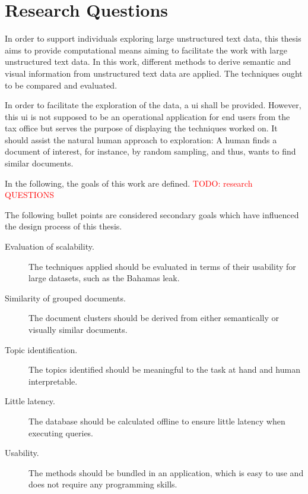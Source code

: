 \section{Research Questions}\label{sec:research-questions}

In order to support individuals exploring large unstructured text data, this thesis aims to provide computational means aiming to facilitate the work with large unstructured text data.
In this work, different methods to derive semantic and visual information from unstructured text data are applied.
The techniques ought to be compared and evaluated.

In order to facilitate the exploration of the data, a \ac{ui} shall be provided.
However, this \ac{ui} is not supposed to be an operational application for end users from the tax office 
but serves the purpose of displaying the techniques worked on.
It should assist the natural human approach to exploration:
A human finds a document of interest, for instance, by random sampling, and thus, wants to find similar documents.

In the following, the goals of this work are defined.
\textcolor{red}{TODO: research QUESTIONS}

The following bullet points are considered secondary goals which have influenced the design process of this thesis.
\begin{description}
    \item[Evaluation of scalability.]
    The techniques applied should be evaluated in terms of their usability for large datasets, such as the Bahamas leak.
    \item[Similarity of grouped documents.]
    The document clusters should be derived from either semantically or visually similar documents.
    \item[Topic identification.]
    The topics identified should be meaningful to the task at hand and human interpretable.  
    \item[Little latency.]
    The database should be calculated offline to ensure little latency when executing queries.
    \item[Usability.]
    The methods should be bundled in an application, which is easy to use and does not require any programming skills.
\end{description}